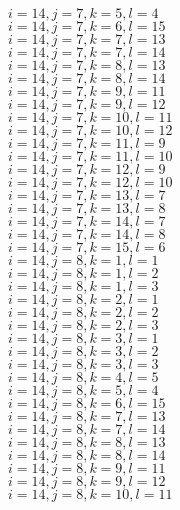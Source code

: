 \documentclass[14pt]{article}
\begin{document}
    $i=14,j=7,k=5,l=4 $ \\ 
    $i=14,j=7,k=6,l=15 $ \\ 
    $i=14,j=7,k=7,l=13 $ \\ 
    $i=14,j=7,k=7,l=14 $ \\ 
    $i=14,j=7,k=8,l=13 $ \\ 
    $i=14,j=7,k=8,l=14 $ \\ 
    $i=14,j=7,k=9,l=11 $ \\ 
    $i=14,j=7,k=9,l=12 $ \\ 
    $i=14,j=7,k=10,l=11 $ \\ 
    $i=14,j=7,k=10,l=12 $ \\ 
    $i=14,j=7,k=11,l=9 $ \\ 
    $i=14,j=7,k=11,l=10 $ \\ 
    $i=14,j=7,k=12,l=9 $ \\ 
    $i=14,j=7,k=12,l=10 $ \\ 
    $i=14,j=7,k=13,l=7 $ \\ 
    $i=14,j=7,k=13,l=8 $ \\ 
    $i=14,j=7,k=14,l=7 $ \\ 
    $i=14,j=7,k=14,l=8 $ \\ 
    $i=14,j=7,k=15,l=6 $ \\ 
    $i=14,j=8,k=1,l=1 $ \\ 
    $i=14,j=8,k=1,l=2 $ \\ 
    $i=14,j=8,k=1,l=3 $ \\ 
    $i=14,j=8,k=2,l=1 $ \\ 
    $i=14,j=8,k=2,l=2 $ \\ 
    $i=14,j=8,k=2,l=3 $ \\ 
    $i=14,j=8,k=3,l=1 $ \\ 
    $i=14,j=8,k=3,l=2 $ \\ 
    $i=14,j=8,k=3,l=3 $ \\ 
    $i=14,j=8,k=4,l=5 $ \\ 
    $i=14,j=8,k=5,l=4 $ \\ 
    $i=14,j=8,k=6,l=15 $ \\ 
    $i=14,j=8,k=7,l=13 $ \\ 
    $i=14,j=8,k=7,l=14 $ \\ 
    $i=14,j=8,k=8,l=13 $ \\ 
    $i=14,j=8,k=8,l=14 $ \\ 
    $i=14,j=8,k=9,l=11 $ \\ 
    $i=14,j=8,k=9,l=12 $ \\ 
    $i=14,j=8,k=10,l=11 $ \\ 
\end{document}

